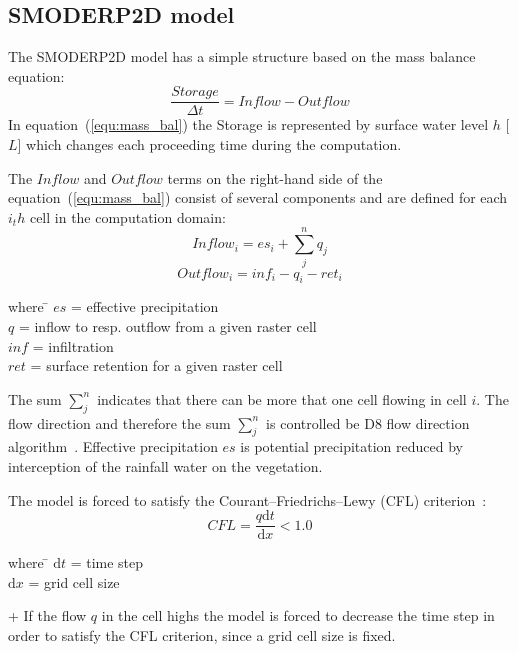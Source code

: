 \subsection{SMODERP2D model}
The SMODERP2D model has a simple structure based on the mass balance equation:
\begin{equation}\label{equ:mass_bal}
    \frac{Storage}{\Delta t} = \nonumber  
    Inflow - Outflow
\end{equation}
In equation~(\ref{equ:mass_bal}) the Storage is represented by
surface water level $h$ [$L$] which changes each proceeding time
during the computation.

The $Inflow$ and $Outflow$ terms on the right-hand side of
the equation~(\ref{equ:mass_bal}) consist of several components and are
defined for each $i_th$ cell in the computation domain:
\begin{equation}\label{equ:inflow}
    Inflow_i = es_{i} + \sum_j^n q_{j}
\end{equation}
\begin{equation}\label{equ:outflow}
    Outflow_i = inf_{i} - q_{i} - ret_i
\end{equation}
\begin{tabbing} 
where \hspace{0.6cm} \= $es$ = effective precipitation\\
\> $q$ = inflow to resp. outflow from a given raster cell\\
\> $inf$ = infiltration\\
\> $ret$ = surface retention for a given raster cell
\end{tabbing}
The sum $\sum_j^n$ indicates that there can be more that one cell
flowing in cell $i$. The flow direction and therefore the sum $\sum_j^n$
is controlled be D8 flow direction algorithm~\cite{ocallaghan1984}.  Effective
precipitation $es$ is potential precipitation reduced by
interception of the rainfall water on the vegetation.

The model is forced to satisfy the Courant--Friedrichs--Lewy (CFL)
criterion~\cite{courant1928}:
\begin{equation}\label{equ:CFL}
    CFL = \frac{q\textrm{d}t}{\textrm{d}x} < 1.0
\end{equation}
\begin{tabbing} 
where \hspace{0.6cm} \= $\textrm{d}t$ = time step\\
\> $\textrm{d}x$ = grid cell size
\end{tabbing}
+%
If the flow $q$ in the cell highs the model is forced to decrease the
time step in order to satisfy the CFL criterion, since a grid cell size
is fixed.

